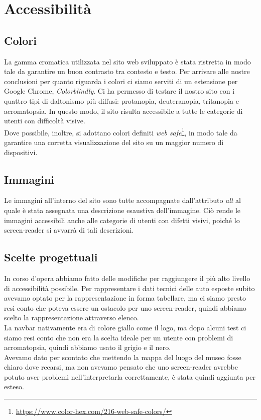 \section{Accessibilità}
\subsection{Colori}
La gamma cromatica utilizzata nel sito web sviluppato è stata ristretta in modo tale da garantire un buon contrasto tra contesto e testo. Per arrivare alle nostre conclusioni per quanto riguarda i colori ci siamo
serviti di un estensione per Google Chrome, \textit{Colorblindly}. Ci ha permesso di testare il nostro sito
con i quattro tipi di daltonismo più diffusi: protanopia, deuteranopia, tritanopia e acromatopsia. In questo modo, il sito risulta accessibile a tutte le categorie di utenti con difficoltà visive.\\
Dove possibile, inoltre, si adottano colori definiti \textit{web safe}\footnote{\url{https://www.color-hex.com/216-web-safe-colors/}}, in modo tale da garantire una corretta visualizzazione del sito su un maggior numero di dispositivi.

\subsection{Immagini}
Le immagini all'interno del sito sono tutte accompagnate dall'attributo \textit{alt} al quale è stata assegnata una descrizione esaustiva dell'immagine. Ciò rende le immagini accessibili anche alle categorie di utenti con difetti visivi, poiché lo screen-reader si avvarrà di tali descrizioni.

\subsection{Scelte progettuali}
In corso d'opera abbiamo fatto delle modifiche per raggiungere il più alto livello di accessibilità possibile.
Per rappresentare i dati tecnici delle auto esposte subito avevamo optato per la rappresentazione in forma
tabellare, ma ci siamo presto resi conto che poteva essere un ostacolo per uno screen-reader, quindi abbiamo
scelto la rappresentazione attraverso elenco. \\
La navbar nativamente era di colore giallo come il logo, ma dopo alcuni test ci siamo resi conto che non era
la scelta ideale per un utente con problemi di acromatopsia, quindi abbiamo usato il grigio e il nero. \\
Avevamo dato per scontato che mettendo la mappa del luogo del museo fosse chiaro dove recarsi, ma non avevamo
pensato che uno screen-reader avrebbe potuto aver problemi nell'interpretarla correttamente, è stata quindi aggiunta per esteso.


